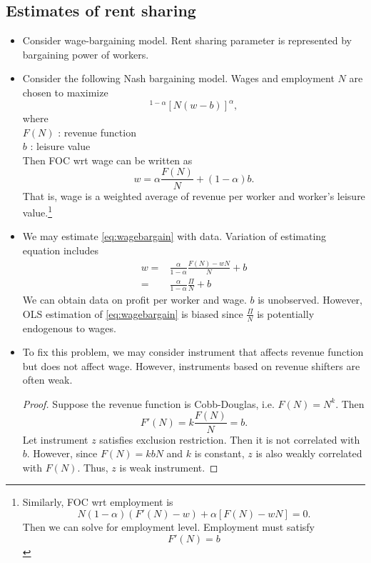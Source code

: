 \documentclass[a4paper, 12pt]{article}
\begin{document}
\subsection{Estimates of rent sharing}
\begin{itemize}
\item Consider wage-bargaining model. Rent sharing parameter is represented by bargaining power of workers.
\item Consider the following Nash bargaining model. Wages and employment $N$ are chosen to maximize
\begin{equation}
[F(N)-wN]^{1-\alpha}
[N(w-b)]^\alpha,
\end{equation}
where \\
$F(N)$ : revenue function \\
$b$ : leisure value \\
Then FOC wrt wage can be written as
\begin{equation}
w = \alpha \frac{F(N)}{N}+(1-\alpha)b.
\label{eq:wagebargain}
\end{equation}
That is, wage is a weighted average of revenue per worker and worker's leisure value.\footnote{Similarly, FOC wrt employment is
$$
N(1-\alpha)(F'(N)-w)+\alpha[F(N)-wN]=0.
$$
Then we can solve for employment level. Employment must satisfy
\begin{equation}
F'(N) = b
\end{equation}
}
\item We may estimate \eqref{eq:wagebargain} with data. Variation of estimating equation includes
\begin{align}
w =& \frac{\alpha}{1-\alpha}
\frac{F(N)-wN}{N}+b \\
=&
\frac{\alpha}{1-\alpha}
\frac{\Pi}{N}
+b
\end{align}
We can obtain data on profit per worker and wage. $b$ is unobserved. However, OLS estimation of \eqref{eq:wagebargain} is biased since $\frac{\Pi}{N}$ is potentially endogenous to wages. 
\item To fix this problem, we may consider instrument that affects revenue function but does not affect wage. However, instruments based on revenue shifters are often weak.
\begin{proof}
Suppose the revenue function is Cobb-Douglas, i.e. $F(N) = N^k$. Then
$$
F'(N) = k\frac{F(N)}{N}=b.
$$
Let instrument $z$ satisfies exclusion restriction. Then it is not correlated with $b$. However, since $F(N)=kbN$ and $k$ is constant, $z$ is also weakly correlated with $F(N)$. Thus, $z$ is weak instrument.
\end{proof}

\end{itemize}
\end{document}
